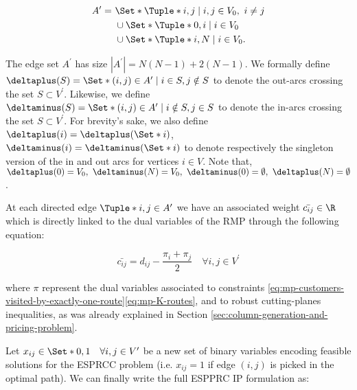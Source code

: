 \begin{equation}
	\begin{aligned}
		A^\prime = \  & \Set*{\Tuple*{i, j} \mid i, j \in V_0,\ i \ne j} \\
		              & \cup \Set*{\Tuple*{0, i} \mid i \in V_0}         \\
		              & \cup \Set*{\Tuple*{i, N} \mid i \in V_0}.
	\end{aligned}
\end{equation}

The edge set $A^\prime$ has size $|A^\prime| = N(N - 1) + 2(N - 1)$.
We formally define $\deltaplus(S) = \Set*{(i, j) \in A^\prime \mid i \in S, j \notin S}$
to denote the out-arcs crossing the set $S \subset V^\prime$.
Likewise, we define $\deltaminus(S) = \Set*{(i, j) \in A^\prime \mid i \notin S, j \in S}$
to denote the in-arcs crossing the set $S \subset V^\prime$.
For brevity’s sake,
we also define $\deltaplus(i) = \deltaplus(\Set*{i})$, $\deltaminus(i) = \deltaminus(\Set*{i})$
to denote respectively the singleton version of the in and out arcs for vertices $i \in V$.
Note that, $\deltaplus(0) = V_0,\ \deltaminus(N) = V_0,\ \deltaminus(0) = \emptyset,\ \deltaplus(N) = \emptyset$.

At each directed edge $\Tuple*{i, j} \in A^\prime$ we have an associated weight $\bar{c_{ij}} \in \R$ which is directly linked to the dual variables of the RMP through the following equation:

\begin{equation}
	\bar{c_{ij}} = d_{ij} - \frac{\pi_i + \pi_j}{2} \quad \forall i, j \in V^\prime
\end{equation}

where $\pi$ represent the dual variables associated to constraints \eqref{eq:mp-customers-visited-by-exactly-one-route}\eqref{eq:mp-K-routes},
and to robust cutting-planes inequalities,
as was already explained in Section \ref{sec:column-generation-and-pricing-problem}.

Let $x_{ij} \in \Set*{0, 1} \quad \forall i, j \in V^\prime$ be a new set of binary variables
encoding feasible solutions for the ESPRCC problem (i.e. $x_{ij} = 1$ if edge $(i, j)$ is picked in the optimal path).
We can finally write the full ESPPRC IP formulation as:

